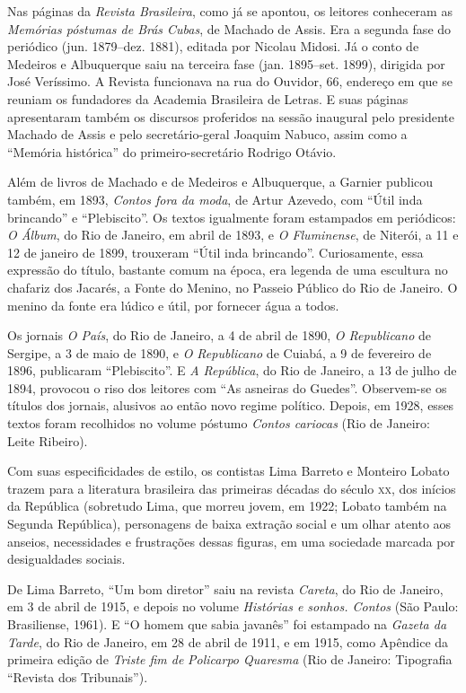 Nas páginas da \emph{Revista Brasileira}, como já se apontou, os
leitores conheceram as \emph{Memórias póstumas de Brás Cubas}, de
Machado de Assis. Era a segunda fase do periódico (jun. 1879--dez. 1881),
editada por Nicolau Midosi. Já o conto de Medeiros e Albuquerque saiu na
terceira fase (jan. 1895--set. 1899), dirigida por José Veríssimo. A
Revista funcionava na rua do Ouvidor, 66, endereço em que se reuniam os
fundadores da Academia Brasileira de Letras. E suas páginas apresentaram
também os discursos proferidos na sessão inaugural pelo presidente
Machado de Assis e pelo secretário-geral Joaquim Nabuco, assim como a
``Memória histórica'' do primeiro-secretário Rodrigo Otávio.

Além de livros de Machado e de Medeiros e Albuquerque, a Garnier
publicou também, em 1893, \emph{Contos fora da moda}, de Artur Azevedo,
com ``Útil inda brincando'' e ``Plebiscito''. Os textos igualmente foram
estampados em periódicos: \emph{O Álbum}, do Rio de Janeiro, em abril de
1893, e \emph{O Fluminense}, de Niterói, a 11 e 12 de janeiro de 1899,
trouxeram ``Útil inda brincando''. Curiosamente, essa expressão do
título, bastante comum na época, era legenda de uma escultura no
chafariz dos Jacarés, a Fonte do Menino, no Passeio Público do Rio de
Janeiro. O menino da fonte era lúdico e útil, por fornecer água a todos.

Os jornais \emph{O País}, do Rio de Janeiro, a 4 de abril de 1890,
\emph{O Republicano} de Sergipe, a 3 de maio de 1890, e \emph{O
Republicano} de Cuiabá, a 9 de fevereiro de 1896, publicaram
``Plebiscito''. E \emph{A República}, do Rio de Janeiro, a 13 de julho
de 1894, provocou o riso dos leitores com ``As asneiras do Guedes''.
Observem-se os títulos dos jornais, alusivos ao então novo regime
político. Depois, em 1928, esses textos foram recolhidos no volume
póstumo \emph{Contos cariocas} (Rio de Janeiro: Leite Ribeiro).

Com suas especificidades de estilo, os contistas Lima Barreto e Monteiro
Lobato trazem para a literatura brasileira das primeiras décadas do
século \textsc{xx}, dos inícios da República (sobretudo Lima, que morreu jovem,
em 1922; Lobato também na Segunda República), personagens de baixa
extração social e um olhar atento aos anseios, necessidades e
frustrações dessas figuras, em uma sociedade marcada por desigualdades
sociais.

De Lima Barreto, ``Um bom diretor'' saiu na revista \emph{Careta}, do
Rio de Janeiro, em 3 de abril de 1915, e depois no volume
\emph{Histórias e sonhos. Contos} (São Paulo: Brasiliense, 1961). E ``O
homem que sabia javanês'' foi estampado na \emph{Gazeta da Tarde}, do
Rio de Janeiro, em 28 de abril de 1911, e em 1915, como Apêndice da
primeira edição de \emph{Triste fim de} \emph{Policarpo Quaresma} (Rio
de Janeiro: Tipografia ``Revista dos Tribunais'').

